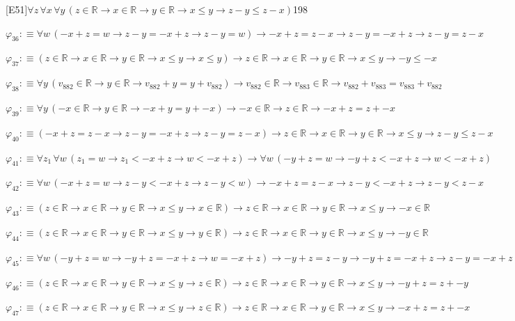 \begin{fullproof}{[E51]}{$\forall z\,\forall x\,\forall y\,(z \in \mathbb{R} \to x \in \mathbb{R} \to y \in \mathbb{R} \to x \leq y \to z - y \leq z - x)$}{198}
\begin{abbrevlist}
\item $\varphi_{36} :\equiv \forall w\,(-x + z = w \to z - y = -x + z \to z - y = w) \to -x + z = z - x \to z - y = -x + z \to z - y = z - x$
\item $\varphi_{37} :\equiv (z \in \mathbb{R} \to x \in \mathbb{R} \to y \in \mathbb{R} \to x \leq y \to x \leq y) \to z \in \mathbb{R} \to x \in \mathbb{R} \to y \in \mathbb{R} \to x \leq y \to -y \leq -x$
\item $\varphi_{38} :\equiv \forall y\,(v_{882} \in \mathbb{R} \to y \in \mathbb{R} \to v_{882} + y = y + v_{882}) \to v_{882} \in \mathbb{R} \to v_{883} \in \mathbb{R} \to v_{882} + v_{883} = v_{883} + v_{882}$
\item $\varphi_{39} :\equiv \forall y\,(-x \in \mathbb{R} \to y \in \mathbb{R} \to -x + y = y + -x) \to -x \in \mathbb{R} \to z \in \mathbb{R} \to -x + z = z + -x$
\item $\varphi_{40} :\equiv (-x + z = z - x \to z - y = -x + z \to z - y = z - x) \to z \in \mathbb{R} \to x \in \mathbb{R} \to y \in \mathbb{R} \to x \leq y \to z - y \leq z - x$
\item $\varphi_{41} :\equiv \forall z_{1}\,\forall w\,(z_{1} = w \to z_{1} < -x + z \to w < -x + z) \to \forall w\,(-y + z = w \to -y + z < -x + z \to w < -x + z)$
\item $\varphi_{42} :\equiv \forall w\,(-x + z = w \to z - y < -x + z \to z - y < w) \to -x + z = z - x \to z - y < -x + z \to z - y < z - x$
\item $\varphi_{43} :\equiv (z \in \mathbb{R} \to x \in \mathbb{R} \to y \in \mathbb{R} \to x \leq y \to x \in \mathbb{R}) \to z \in \mathbb{R} \to x \in \mathbb{R} \to y \in \mathbb{R} \to x \leq y \to -x \in \mathbb{R}$
\item $\varphi_{44} :\equiv (z \in \mathbb{R} \to x \in \mathbb{R} \to y \in \mathbb{R} \to x \leq y \to y \in \mathbb{R}) \to z \in \mathbb{R} \to x \in \mathbb{R} \to y \in \mathbb{R} \to x \leq y \to -y \in \mathbb{R}$
\item $\varphi_{45} :\equiv \forall w\,(-y + z = w \to -y + z = -x + z \to w = -x + z) \to -y + z = z - y \to -y + z = -x + z \to z - y = -x + z$
\item $\varphi_{46} :\equiv (z \in \mathbb{R} \to x \in \mathbb{R} \to y \in \mathbb{R} \to x \leq y \to z \in \mathbb{R}) \to z \in \mathbb{R} \to x \in \mathbb{R} \to y \in \mathbb{R} \to x \leq y \to -y + z = z + -y$
\item $\varphi_{47} :\equiv (z \in \mathbb{R} \to x \in \mathbb{R} \to y \in \mathbb{R} \to x \leq y \to z \in \mathbb{R}) \to z \in \mathbb{R} \to x \in \mathbb{R} \to y \in \mathbb{R} \to x \leq y \to -x + z = z + -x$

\end{abbrevlist}
\end{fullproof}
